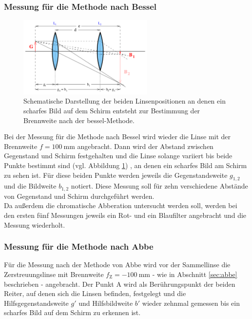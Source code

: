 \subsubsection{Messung für die Methode nach Bessel}
\begin{figure}
  \centering
  \includegraphics[width=0.6\textwidth]{Bilder/Bessel.png}
  \caption{Schematische Darstellung der beiden Linsenpositionen an denen ein scharfes Bild auf dem Schirm entsteht zur Bestimmung der Brennweite nach der bessel-Methode.}
  \label{fig:besselmess}
\end{figure}
Bei der Messung für die Methode nach Bessel wird wieder die Linse mit der Brennweite
$f=\SI{100}{\milli\meter}$ angebracht.
Dann wird der Abstand zwischen Gegenstand und Schirm festgehalten und die Linse solange variiert
bis beide Punkte bestimmt sind (vgl. Abbildung \ref{fig:besselmess}) , an denen ein scharfes Bild am Schirm zu sehen ist.
Für diese beiden Punkte werden jeweils die Gegenstandsweite $g_{1,2}$ und die Bildweite
$b_{1,2}$ notiert. Diese Messung soll für zehn verschiedene Abstände von Gegenstand und Schirm
durchgeführt werden.\\
Da außerdem die chromatische Abberation untersucht werden soll, werden bei den ersten fünf
Messungen jeweils ein Rot- und ein Blaufilter angebracht und die Messung wiederholt.

\subsubsection{Messung für die Methode nach Abbe}

Für die Messung nach der Methode von Abbe wird vor der Sammellinse die Zerstreuungslinse mit
Brennweite $f_{\mathrm{Z}}=-\SI{100}{\milli\meter}$ - wie in Abschnitt \ref{sec:abbe}
beschrieben - angebracht. Der Punkt A wird als Berührungspunkt der beiden Reiter, auf denen
sich die Linsen befinden, festgelegt und die Hilfsgegenstandsweite $g'$  und Hilfsbildweite $b'$ wieder zehnmal
gemessen bis ein scharfes Bild auf dem Schirm zu erkennen ist.
